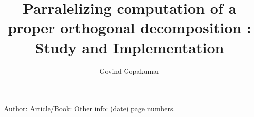 \documentclass{llncs}
\begin{document}
\title{Parralelizing computation of a proper orthogonal decomposition : Study and Implementation}


\author{ Govind Gopakumar}



\maketitle

\begin{abstract}

\end{abstract}

 


 \begin{thebibliography}{1}
		 Author:
		 Article/Book:
		 Other info: (date) page numbers.
 \end{thebibliography}

 
\end{document}
